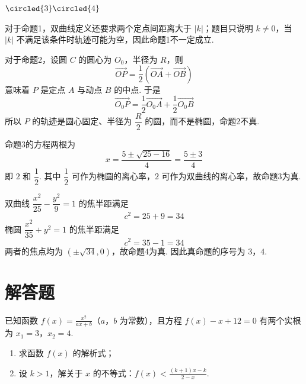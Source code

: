 \begin{answer}\(\circled{3}\circled{4}\)\end{answer}

\begin{solution}
对于命题1，双曲线定义还要求两个定点间距离大于 \(\lvert k\rvert\)；题目只说明 \(k\ne0\)，当 \(\lvert k\rvert\) 不满足该条件时轨迹可能为空，因此命题1不一定成立.

对于命题2，设圆 \(C\) 的圆心为 \(O_{0}\)，半径为 \(R\)，则
\[
\overrightarrow{OP}=\frac12\left(\overrightarrow{OA}+\overrightarrow{OB}\right)
\]
意味着 \(P\) 是定点 \(A\) 与动点 \(B\) 的中点. 于是
\[
\overrightarrow{O_{0}P}
=\frac12\overrightarrow{O_{0}A}+\frac12\overrightarrow{O_{0}B}
\]
所以 \(P\) 的轨迹是圆心固定、半径为 \(\dfrac R2\) 的圆，而不是椭圆，命题2不真.

命题3的方程两根为
\[
x=\frac{5\pm\sqrt{25-16}}4=\frac{5\pm3}{4}
\]
即 \(2\) 和 \(\dfrac12\). 其中 \(\dfrac12\) 可作为椭圆的离心率，\(2\) 可作为双曲线的离心率，故命题3为真.

双曲线 \(\dfrac{x^{2}}{25}-\dfrac{y^{2}}9=1\) 的焦半距满足
\[
c^{2}=25+9=34
\]
椭圆 \(\dfrac{x^{2}}{35}+y^{2}=1\) 的焦半距满足
\[
c^{2}=35-1=34
\]
两者的焦点均为 \((\pm\sqrt{34},0)\)，故命题4为真. 因此真命题的序号为 \(3\)，\(4\).
\end{solution}

\section{解答题}
\begin{problem}
已知函数 \(f(x)=\frac{x^{2}}{ax+b}\)（\(a\)，\(b\) 为常数），且方程 \(f(x)-x+12=0\) 有两个实根为 \(x_1=3\)，\(x_2=4\).

\begin{enumerate}
\item 求函数 \(f(x)\) 的解析式；
\item 设 \(k>1\)，解关于 \(x\) 的不等式：\(f(x)<\frac{(k+1)x-k}{2-x}\).
\end{enumerate}
\end{problem}

